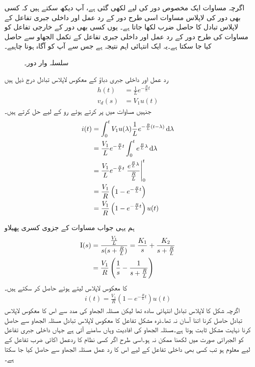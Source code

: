 اگرچہ مساوات  ایک مخصوص دور کی لیے لکھی گئی ہے، آپ دیکھ سکتے ہیں کہ کسی بھی دور کی لاپلاس مساوات اسی طرح دور کے رد عمل اور داخلی جبری تفاعل کے لاپلاس تبادل کا حاصل ضرب لکھا جاتا ہے۔ یوں کسی بھی دور کے خارجی تفاعل کو مساوات  کی طرح دور کے رد عمل اور داخلی جبری تفاعل کے تکمل الجھاو  سے حاصل کیا جا سکتا ہے۔یہ ایک انتہائی اہم نتیجہ ہے جس سے آپ کو آگاہ ہونا چاہیے۔
\begin{figure}
\centering
{}
\caption{سلسلہ وار  دور۔}
\label{شکل_لاپلاس_دور_کا_حل}
\end{figure}

رد عمل  اور داخلی جبری دباؤ کے معکوس لاپلاس تبادل درج ذیل ہیں
\begin{align*}
h(t)&=\frac{1}{L}e^{-\frac{R}{L}t}\\
v_d(s)&=V_1 u(t)
\end{align*}
جنہیں مساوات  میں پر کرتے ہوئے رو کے لیے حل کرتے ہیں۔
\begin{align*}
i(t)&=\int_0^t V_1 u(\lambda) \frac{1}{L}e^{-\frac{R}{L}(t-\lambda)} \dif \lambda\\
&=\frac{V_1}{L}e^{-\frac{R}{L}t}\int_0^t e^{\frac{R}{L}\lambda} \dif \lambda\\
&=\frac{V_1}{L}e^{-\frac{R}{L}t}\left. \frac{ e^{\frac{R}{L}\lambda}}{\frac{R}{L}} \right|_0^t\\
&=\frac{V_1}{R}\left(1-e^{-\frac{R}{L}t}\right)\\
&=\frac{V_1}{R}\left(1-e^{-\frac{R}{L}t}\right)u(t)
\end{align*}

ہم یہی جواب مساوات  کے جزوی کسری پھیلاو
\begin{align*}
{\ensuremath{{\textup{I}}}}(s)&=\frac{\frac{V_1}{L}}{s(s+\frac{R}{L})}=\frac{K_1}{s}+\frac{K_2}{s+\frac{R}{L}}\\
&=\frac{V_1}{R}\left(\frac{1}{s}-\frac{1}{s+\frac{R}{L}}\right)
\end{align*}
کا معکوس لاپلاس لیتے ہوئے حاصل کر سکتے ہیں۔
\begin{align*}
i(t)=\frac{V_1}{R}\left(1-e^{-\frac{R}{L}t}\right)u(t)
\end{align*}
اگرچہ شکل  کا لاپلاس تبادل انتہائی سادہ تھا لیکن مسئلہ الجھاو کی مدد سے اس کا معکوس لاپلاس تبادل حاصل کرنا اتنا آسان نہ تھا۔ذرہ مشکل تفاعل کا معکوس لاپلاس تبادل مسئلہ الجھاو سے حاصل کرنا نہایت مشکل ثابت ہوتا ہے۔مسئلہ الجھاو کی افادیت وہاں سامنے آتی ہے جہاں داخلی جبری تفاعل کو الجبرائی صورت میں لکھنا ممکن نہ ہو۔اسی طرح اگر کسی نظام کا ردعمل اکائی ضرب تفاعل کے لیے معلوم ہو تب کسی بھی داخلی تفاعل کے لیے اس کا رد عمل مسئلہ الجھاو سے حاصل کیا جا سکتا ہے۔ 


